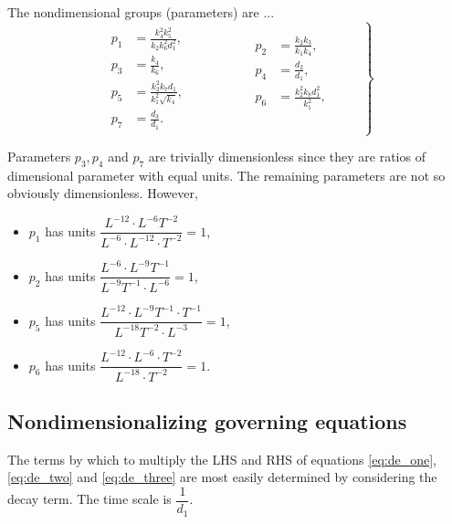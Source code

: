 \documentclass[10pt,letterpaper]{article}
\begin{document}
The nondimensional groups (parameters) are ...
\begin{equation}\label{eq:parameters}
\left.
\begin{gathered}\begin{aligned}
p_1 &= \frac{k_4^2 k_5^2}{k_2 k_6^2 d_1^2},  \\
p_3 &= \frac{k_4}{k_6}, \\
p_5 &= \frac{k_2^2 k_7 d_1}{k_1^2 \sqrt{k_4}}, \\
p_7 &= \frac{d_3}{d_1}.
\end{aligned}\end{gathered}
\qquad \qquad
\begin{gathered}\begin{aligned}
p_2 &= \frac{k_2 k_3}{k_1 k_4}, \\
p_4 &= \frac{d_2}{d_1}, \\
p_6 &= \frac{k_2^2 k_8 d_1^2}{k_1^2}, \\
& \\
\end{aligned}\end{gathered}
\qquad \right \}
\end{equation}

Parameters $p_3, p_4$ and $p_7$ are trivially dimensionless  since they are ratios of dimensional parameter with equal units. The remaining parameters are not so obviously dimensionless. However,
\begin{itemize}
  \item $p_1$ has units $\dfrac{L^{-12}\cdot L^{-6}T^{-2}}  {L^{-6} \cdot L^{-12} \cdot T^{-2}} = 1$,
  \item $p_2$ has units $\dfrac{L^{-6} \cdot L^{-9}T^{-1}}  {L^{-9} T^{-1} \cdot L^{-6}} = 1$,
  \item $p_5$ has units $\dfrac{L^{-12}\cdot L^{-9}T^{-1} \cdot T^{-1} }  {L^{-18} T^{-2} \cdot L^{-3}} = 1$,
  \item $p_6$ has units $\dfrac{L^{-12}\cdot L^{-6} \cdot T^{-2}}  {L^{-18}\cdot T^{-2}} = 1$.
\end{itemize}


\subsection{Nondimensionalizing governing equations}

The terms by which to multiply the LHS and RHS of equations \ref{eq:de_one}, \ref{eq:de_two} and \ref{eq:de_three} are most easily determined by considering the decay term. The time scale is $\dfrac{1}{d_1}$.
\end{document}
